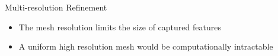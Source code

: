 \begin{frame}{Multi-resolution Refinement}
    \begin{itemize}
        \item The mesh resolution limits the size of captured features
        \item A uniform high resolution mesh would be computationally intractable
    \end{itemize}
    \begin{center}%
\end{center}
\end{frame}
